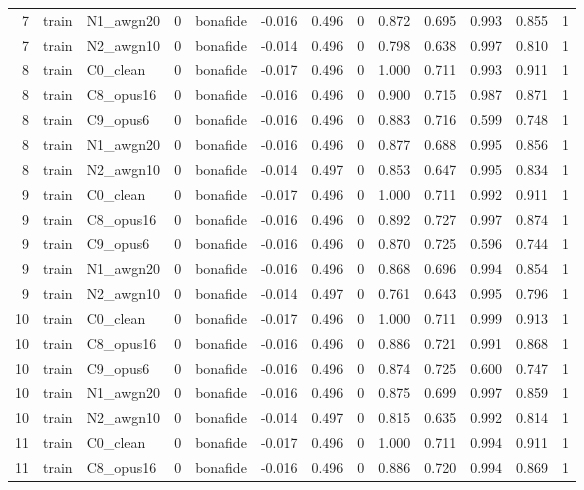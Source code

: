 \begin{tabular}{rllrlrrrrrrrr}
7 & train & N1_awgn20 & 0 & bonafide & -0.016 & 0.496 & 0 & 0.872 & 0.695 & 0.993 & 0.855 & 1 \\
7 & train & N2_awgn10 & 0 & bonafide & -0.014 & 0.496 & 0 & 0.798 & 0.638 & 0.997 & 0.810 & 1 \\
8 & train & C0_clean & 0 & bonafide & -0.017 & 0.496 & 0 & 1.000 & 0.711 & 0.993 & 0.911 & 1 \\
8 & train & C8_opus16 & 0 & bonafide & -0.016 & 0.496 & 0 & 0.900 & 0.715 & 0.987 & 0.871 & 1 \\
8 & train & C9_opus6 & 0 & bonafide & -0.016 & 0.496 & 0 & 0.883 & 0.716 & 0.599 & 0.748 & 1 \\
8 & train & N1_awgn20 & 0 & bonafide & -0.016 & 0.496 & 0 & 0.877 & 0.688 & 0.995 & 0.856 & 1 \\
8 & train & N2_awgn10 & 0 & bonafide & -0.014 & 0.497 & 0 & 0.853 & 0.647 & 0.995 & 0.834 & 1 \\
9 & train & C0_clean & 0 & bonafide & -0.017 & 0.496 & 0 & 1.000 & 0.711 & 0.992 & 0.911 & 1 \\
9 & train & C8_opus16 & 0 & bonafide & -0.016 & 0.496 & 0 & 0.892 & 0.727 & 0.997 & 0.874 & 1 \\
9 & train & C9_opus6 & 0 & bonafide & -0.016 & 0.496 & 0 & 0.870 & 0.725 & 0.596 & 0.744 & 1 \\
9 & train & N1_awgn20 & 0 & bonafide & -0.016 & 0.496 & 0 & 0.868 & 0.696 & 0.994 & 0.854 & 1 \\
9 & train & N2_awgn10 & 0 & bonafide & -0.014 & 0.497 & 0 & 0.761 & 0.643 & 0.995 & 0.796 & 1 \\
10 & train & C0_clean & 0 & bonafide & -0.017 & 0.496 & 0 & 1.000 & 0.711 & 0.999 & 0.913 & 1 \\
10 & train & C8_opus16 & 0 & bonafide & -0.016 & 0.496 & 0 & 0.886 & 0.721 & 0.991 & 0.868 & 1 \\
10 & train & C9_opus6 & 0 & bonafide & -0.016 & 0.496 & 0 & 0.874 & 0.725 & 0.600 & 0.747 & 1 \\
10 & train & N1_awgn20 & 0 & bonafide & -0.016 & 0.496 & 0 & 0.875 & 0.699 & 0.997 & 0.859 & 1 \\
10 & train & N2_awgn10 & 0 & bonafide & -0.014 & 0.497 & 0 & 0.815 & 0.635 & 0.992 & 0.814 & 1 \\
11 & train & C0_clean & 0 & bonafide & -0.017 & 0.496 & 0 & 1.000 & 0.711 & 0.994 & 0.911 & 1 \\
11 & train & C8_opus16 & 0 & bonafide & -0.016 & 0.496 & 0 & 0.886 & 0.720 & 0.994 & 0.869 & 1 \\

\end{tabular}
